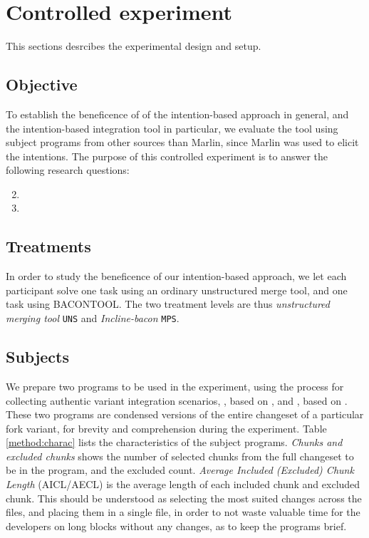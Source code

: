 \section{Controlled experiment}
This sections desrcibes the experimental design and setup.

\subsection{Objective}
To establish the beneficence of of the intention-based approach in general, and the intention-based integration tool in particular, we evaluate the tool using subject programs from other sources than Marlin, since Marlin was used to elicit the intentions. The purpose of this controlled experiment is to answer the following research questions:
\begin{enumerate}[label={Q\arabic*}]
    \setcounter{enumi}{1}
    \item \RQB
    \item \RQC
\end{enumerate}

\subsection{Treatments}
In order to study the beneficence of our intention-based approach, we let each participant solve one task using an ordinary unstructured merge tool, and one task using BACONTOOL. The two treatment levels are thus \textit{unstructured merging tool} \texttt{UNS} and \textit{Incline-bacon} \texttt{MPS}.

\subsection{Subjects}
We prepare two programs to be used in the experiment, using the process for collecting authentic variant integration scenarios, \po, based on \busybox, and \pt, based on \vim. These two programs are condensed versions of the entire changeset of a particular fork variant, for brevity and comprehension during the experiment. Table \ref{method:charac} lists the characteristics of the subject programs. \textit{Chunks and excluded chunks} shows the number of selected chunks from the full changeset to be in the program, and the excluded count. \textit{Average Included (Excluded) Chunk Length} (AICL/AECL) is the average length of each included chunk and excluded chunk. This should be understood as selecting the most suited changes across the files, and placing them in a single file, in order to not waste valuable time for the developers on long blocks without any changes, as to keep the programs brief.

